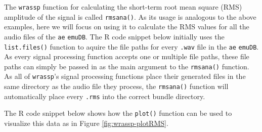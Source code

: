 \documentclass[]{book}
\newenvironment{Shaded}{\begin{snugshade}}{\end{snugshade}}
\newcommand{\CommentTok}[1]{\textcolor[rgb]{0.56,0.35,0.01}{\textit{#1}}}
\newcommand{\DataTypeTok}[1]{\textcolor[rgb]{0.13,0.29,0.53}{#1}}
\newcommand{\DecValTok}[1]{\textcolor[rgb]{0.00,0.00,0.81}{#1}}
\newcommand{\KeywordTok}[1]{\textcolor[rgb]{0.13,0.29,0.53}{\textbf{#1}}}
\newcommand{\NormalTok}[1]{#1}
\newcommand{\OperatorTok}[1]{\textcolor[rgb]{0.81,0.36,0.00}{\textbf{#1}}}
\newcommand{\OtherTok}[1]{\textcolor[rgb]{0.56,0.35,0.01}{#1}}
\newcommand{\StringTok}[1]{\textcolor[rgb]{0.31,0.60,0.02}{#1}}
\theoremstyle{definition}
\theoremstyle{definition}
\theoremstyle{definition}
\theoremstyle{remark}
\begin{document}
The \texttt{wrassp} function for calculating the short-term root mean
square (RMS) amplitude of the signal is called \texttt{rmsana()}. As its
usage is analogous to the above examples, here we will focus on using it
to calculate the RMS values for all the audio files of the \texttt{ae}
\texttt{emuDB}. The R code snippet below initially uses the
\texttt{list.files()} function to aquire the file paths for every
\texttt{.wav} file in the \texttt{ae} \texttt{emuDB}. As every signal
processing function accepts one or multiple file paths, these file paths
can simply be passed in as the main argument to the \texttt{rmsana()}
function. As all of \texttt{wrassp}'s signal processing functions place
their generated files in the same directory as the audio file they
process, the \texttt{rmsana()} function will automatically place every
\texttt{.rms} into the correct bundle directory.

\begin{Shaded}
\end{Shaded}

The R code snippet below shows how the \texttt{plot()} function can be
used to visualize this data as in Figure \ref{fig:wrassp-plotRMS}.
\end{document}
